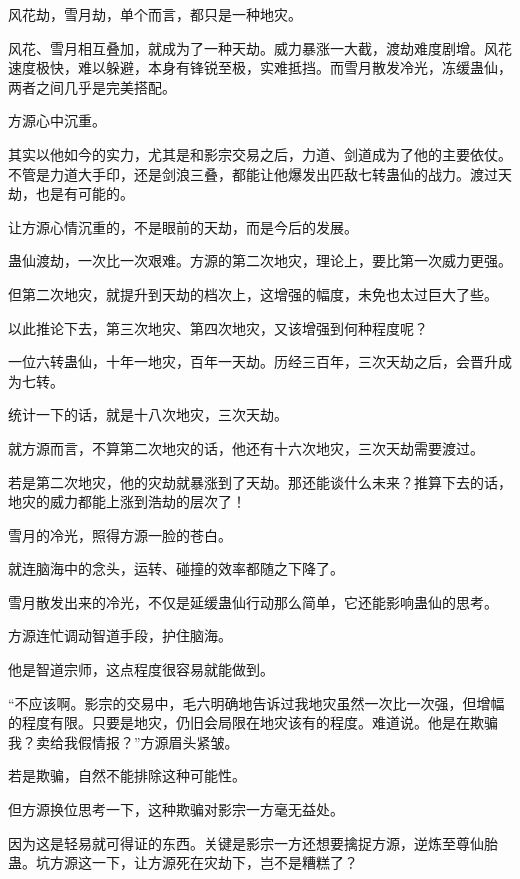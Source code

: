 
\begin{this_body}

风花劫，雪月劫，单个而言，都只是一种地灾。

风花、雪月相互叠加，就成为了一种天劫。威力暴涨一大截，渡劫难度剧增。风花速度极快，难以躲避，本身有锋锐至极，实难抵挡。而雪月散发冷光，冻缓蛊仙，两者之间几乎是完美搭配。

方源心中沉重。

其实以他如今的实力，尤其是和影宗交易之后，力道、剑道成为了他的主要依仗。不管是力道大手印，还是剑浪三叠，都能让他爆发出匹敌七转蛊仙的战力。渡过天劫，也是有可能的。

让方源心情沉重的，不是眼前的天劫，而是今后的发展。

蛊仙渡劫，一次比一次艰难。方源的第二次地灾，理论上，要比第一次威力更强。

但第二次地灾，就提升到天劫的档次上，这增强的幅度，未免也太过巨大了些。

以此推论下去，第三次地灾、第四次地灾，又该增强到何种程度呢？

一位六转蛊仙，十年一地灾，百年一天劫。历经三百年，三次天劫之后，会晋升成为七转。

统计一下的话，就是十八次地灾，三次天劫。

就方源而言，不算第二次地灾的话，他还有十六次地灾，三次天劫需要渡过。

若是第二次地灾，他的灾劫就暴涨到了天劫。那还能谈什么未来？推算下去的话，地灾的威力都能上涨到浩劫的层次了！

雪月的冷光，照得方源一脸的苍白。

就连脑海中的念头，运转、碰撞的效率都随之下降了。

雪月散发出来的冷光，不仅是延缓蛊仙行动那么简单，它还能影响蛊仙的思考。

方源连忙调动智道手段，护住脑海。

他是智道宗师，这点程度很容易就能做到。

“不应该啊。影宗的交易中，毛六明确地告诉过我地灾虽然一次比一次强，但增幅的程度有限。只要是地灾，仍旧会局限在地灾该有的程度。难道说。他是在欺骗我？卖给我假情报？”方源眉头紧皱。

若是欺骗，自然不能排除这种可能性。

但方源换位思考一下，这种欺骗对影宗一方毫无益处。

因为这是轻易就可得证的东西。关键是影宗一方还想要擒捉方源，逆炼至尊仙胎蛊。坑方源这一下，让方源死在灾劫下，岂不是糟糕了？


\end{this_body}
